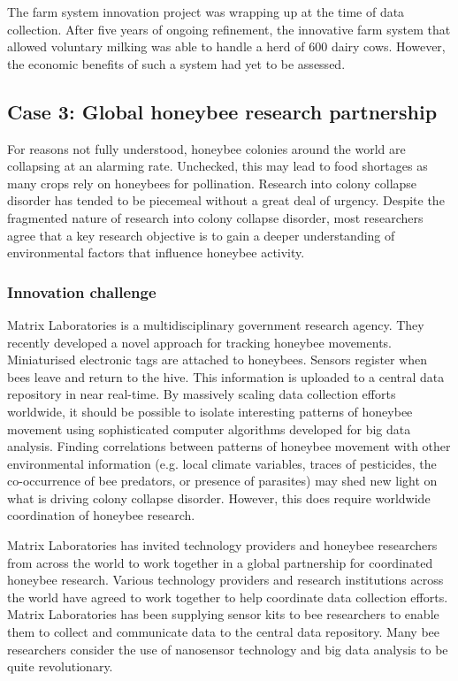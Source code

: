 The farm system innovation project was wrapping up at the time of data collection. After five years of ongoing refinement, the innovative farm system that allowed voluntary milking was able to handle a herd of 600 dairy cows. However, the economic benefits of such a system had yet to be assessed. 

\subsection{Case 3: Global honeybee research partnership}

For reasons not fully understood, honeybee colonies around the world are collapsing at an alarming rate. Unchecked, this may lead to food shortages as many crops rely on honeybees for pollination. Research into colony collapse disorder has tended to be piecemeal without a great deal of urgency. Despite the fragmented nature of research into colony collapse disorder, most researchers agree that a key research objective is to gain a deeper understanding of environmental factors that influence honeybee activity. 

\subsubsection{Innovation challenge}

Matrix Laboratories is a multidisciplinary government research agency. They recently developed a novel approach for tracking honeybee movements. Miniaturised electronic tags are attached to honeybees. Sensors register when bees leave and return to the hive. This information is uploaded to a central data repository in near real-time. By massively scaling data collection efforts worldwide, it should be possible to isolate interesting patterns of honeybee movement using sophisticated computer algorithms developed for big data analysis. Finding correlations between patterns of honeybee movement with other environmental information (e.g. local climate variables, traces of pesticides, the co-occurrence of bee predators, or presence of parasites) may shed new light on what is driving colony collapse disorder. However, this does require worldwide coordination of honeybee research. \medskip 

Matrix Laboratories has invited technology providers and honeybee researchers from across the world to work together in a global partnership for coordinated honeybee research. Various technology providers and research institutions across the world have agreed to work together to help coordinate data collection efforts. Matrix Laboratories has been supplying sensor kits to bee researchers to enable them to collect and communicate data to the central data repository. Many bee researchers consider the use of nanosensor technology and big data analysis to be quite revolutionary.
 \medskip

